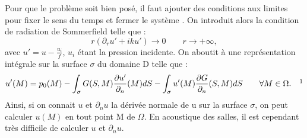 %
%
Pour que le problème soit bien posé, il faut ajouter des conditions aux limites pour fixer le sens du temps et fermer le système \cite[p. 92]{BEM}. On introduit alors la condition de radiation de Sommerfield telle que :
\begin{equation}
r(\partial_ru' + iku') \to 0 \qquad r \to +\infty,
\end{equation}
avec $u' = u - \frac{u_i}{f}$, $u_i$ étant la pression incidente. On aboutit à une représentation intégrale sur la surface $\sigma$ du domaine D telle que :
\begin{equation}
u'(M) = p_0(M) - \int_\sigma G(S,M) \frac{\partial u'}{\partial_n}(M)dS -  \int_\sigma u'(M) \frac{\partial G}{\partial_n}(S,M) dS	 	\qquad  \forall M  \in \Omega.
\ \ \ \footnotemark
\end{equation}
%
Ainsi, si on connait $u$ et $\partial_n u $ la dérivée normale de u sur la surface $\sigma$, on peut calculer $u(M)$ en tout point M de $\Omega$. En acoustique des salles, il est cependant très difficile de calculer $u$ et $\partial_n u $.

